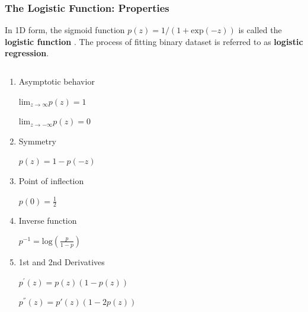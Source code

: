 \documentclass[10pt,aspectratio=169]{beamer}
\begin{document}
\begin{frame}
  \frametitle{The Logistic Function: Properties}
  
  In 1D form, the sigmoid function $p(z) = 1/(1 + \mathrm{exp}(-z))$
  is called the \textbf{logistic function} \let\thefootnote\relax{}.
  The process of fitting binary dataset is referred to as
  \textbf{logistic regression}.

  \begin{columns}[T]
    \begin{column}{0.4\textwidth}
      \begin{enumerate}
      \vfill \item Asymptotic behavior
          
        $\mathrm{lim}_{z\to\infty} p(z) = 1$
          
        $\mathrm{lim}_{z\to-\infty} p(z) = 0$
          
      \vfill \item Symmetry

        $p(z) = 1 - p(-z)$
          
      \vfill \item Point of inflection

        $p(0) = \frac{1}{2}$
          
      \vfill \item Inverse function

        $p^{-1} = \mathrm{log}(\frac{p}{1 - p})$

      \vfill \item 1st and 2nd Derivatives

        $p^{'}(z) = p(z)(1 - p(z))$

        $p^{''}(z) = p'(z)(1 - 2 p(z))$
      \end{enumerate}
    \end{column}

    \begin{column}{0.5\textwidth}


\end{column}
\end{columns}
\end{frame}
\end{document}
